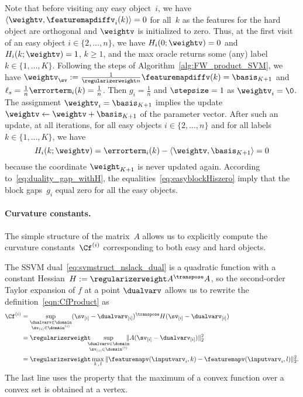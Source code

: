 \documentclass{article}
\begin{document}
Note that before visiting any easy object~$i$, we have $\langle \weightv, \featuremapdiffv_i (k) \rangle = 0$ for all~$k$ as the features for the hard object are orthogonal and $\weightv$ is initialized to zero. Thus, at the first visit of an easy object $i \in \{2,\dots,n\}$, we have $H_i(0;\weightv) = 0$ and $H_i(k;\weightv) = 1$, $k\geq 1$, and the max oracle returns some (any) label~$k \in \{1,\dots,K\}$.
Following the steps of Algorithm~\ref{alg:FW_product_SVM}, we have $\weightv_{\sv} := \frac{1}{\regularizerweight n} \featuremapdiffv (k) = \basis_{K+1}$ and $\ell_s=\frac{1}{n}\errorterm_i(k)=\frac{1}{n}$.
Then $g_i = \frac{1}{n}$ and $\stepsize = 1$ as $\weightv_i = \0$. 
The assignment ${\weightv_i} =  \basis_{K+1}$ implies the update $\weightv \leftarrow \weightv + \basis_{K+1}$ of the parameter vector.
After such an update, at all iterations, for all easy objects $i\in \{2,\dots,n\}$ and for all labels $k \in \{1,\dots,K\}$, we have 
\begin{equation}
\label{eq:easyblockHiszero}
H_i(k;\weightv) = \errorterm_i(k)-\langle \weightv, \basis_{K+1} \rangle=0 
\end{equation}
because the coordinate $\weight_{K+1}$ is never updated again. According to~\eqref{eq:duality_gap_withH}, the equalities~\eqref{eq:easyblockHiszero} imply that the block gaps~$g_i$ equal zero for all the easy objects.

%
%
%
%
%
%
%
%
%
%
%
%
%
%
%
%
%
%
%
%
%
%


\paragraph{Curvature constants.}
The simple structure of the matrix~$A$ allows us to explicitly compute the curvature constants~$\Cf^{(i)}$ corresponding to both easy and hard objects. 

The SSVM dual~\eqref{eq:svmstruct_nslack_dual} is a quadratic function with a constant Hessian~$H:=  \regularizerweight A^\transpose A$, so the second-order Taylor expansion of $f$ at a point $\dualvarv$ allows us to rewrite the definition~\ref{eqn:CfProduct} as
\begin{align*}
\notag
\Cf^{(i)} &= \sup_{\substack{\dualvarv \in \domain\\ \sv_{(i)} \in \domain^{(i)}}}
(\sv_{[i]}-\dualvarv_{[i]})^\transpose   H (\sv_{[i]}-\dualvarv_{[i]}) \\ %
 &= \regularizerweight\!\!\!\! \sup_{\substack{\dualvarv \in \domain\\ \sv_{(i)} \in \domain^{(i)}}}
\!\!\!\! \Vert A (\sv_{[i]}-\dualvarv_{[i]}) \Vert_2^2 \\
 &= \regularizerweight  \max_{k \, , \, l}  \| \featuremapv(\inputvarv_i,k)-\featuremapv(\inputvarv_i,l) \|_2^2 .
\end{align*}
The last line uses the property that the maximum of a convex function over a convex set is obtained at a vertex.
\end{document}
